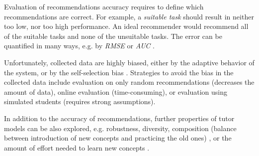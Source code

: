 Evaluation of recommendations accuracy requires to define which
recommendations are correct. For example, a \emph{suitable task} should
result in neither too low, nor too high performance.
An ideal recommender would recommend all of the suitable tasks and none of
the unsuitable tasks.
The error can be quantified in many ways, e.g. by \emph{RMSE} or \emph{AUC}
\cite[section\,8.3.2]{recsys}.

Unfortunately, collected data are highly biased, either by the
adaptive behavior of the system, or by the self-selection bias \cite{data-collection-bias}.
Strategies to avoid the bias in the collected data include
evaluation on only random recommendations (decreases the amount of data),
online evaluation (time-consuming),
or evaluation using simulated students (requires strong assumptions).


In addition to the accuracy of recommendations, %
further properties of tutor models can be also explored,
e.g. robustness, diversity, %
composition (balance between introduction of new concepts and practicing the old ones)
\cite{progression-analysis},  %
or the amount of effort needed to learn new concepts \cite{evaluation-leopard}.  %

